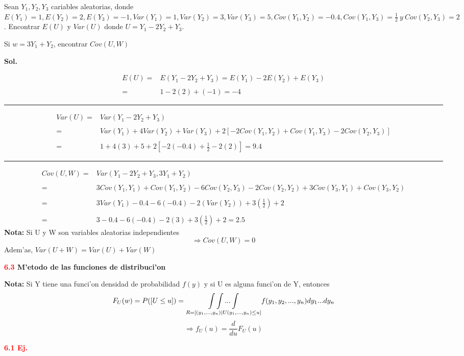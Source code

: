 \documentclass[12pt,letterpaper]{article}
\theoremstyle{definition}
\begin{document}
Sean $Y_1,Y_2,Y_3$ cariables aleatorias, donde $E(Y_1)=1,E(Y_2)=2,E(Y_3)=-1, Var(Y_1)=1,Var(Y_2)=3,Var(Y_3)=5, Cov(Y_1,Y_2)=-0.4,Cov(Y_1,Y_3)=\frac{1}{2}\ y \ Cov(Y_2,Y_3)=2$. Encontrar $E(U)$ y $Var(U)$ donde $U=Y_1-2Y_2+Y_3$.

Si $w=3Y_1+Y_2$, encontrar $Cov(U,W)$

\textbf{Sol.}

\[
\begin{array}{rl}
	E(U)=&E(Y_1-2Y_2+Y_3)=E(Y_1)-2E(Y_2)+E(Y_3)\\ \\
	=& 1-2(2)+(-1)=-4
\end{array}
\]
\par\noindent\rule{\textwidth}{0.5pt}
\[
\begin{array}{rl}
	Var(U)= & Var(Y_1-2Y_2+Y_3)\\ \\
	=&Var(Y_1)+4Var(Y_2)+Var(Y_3)+2[-2Cov(Y_1,Y_2)+Cov(Y_1,Y_3)-2Cov(Y_2,Y_3)]\\ \\
	=& 1+4(3)+5+2[-2(-0.4)+\frac{1}{2}-2(2)]=9.4 
\end{array}
\]
\par\noindent\rule{\textwidth}{0.5pt}
\[
\begin{array}{rl}
	Cov(U,W)=& Var(Y_1-2Y_2+Y_3,3Y_1+Y_2)\\ \\
	=& 3Cov(Y_1,Y_1)+Cov(Y_1,Y_2)-6Cov(Y_2,Y_3)-2 Cov(Y_2,Y_2)+3Cov(Y_3,Y_1)+Cov(Y_3,Y_2)\\ \\
	=& 3Var(Y_1)-0.4-6(-0.4)-2(Var(Y_2))+3(\frac{1}{2})+2\\ \\
	=& 3-0.4-6(-0.4)-2(3)+3(\frac{1}{2})+2=2.5
\end{array}
\]
\textbf{Nota: } Si U y W son variables aleatorias independientes
\[\Rightarrow Cov(U,W)=0\]
Adem'as, $Var(U+W)=Var(U)+Var(W)$

\textbf{\textcolor{red}{6.3} M'etodo de las funciones de distribuci'on}
 
\textbf{Nota: } Si Y tiene una funci'on densidad de probabilidad $f(y)$ y si U es alguna funci'on de Y, entonces 
\[F_U(w)=P([U\leq u])=\underset{\begin{tiny}
R=[(y_1,...,y_n)|U(y_1,...,y_n)\leq u]
\end{tiny}}{\int\int...\int} f(y_1,y_2,...,y_n)dy_1...dy_n\]
\[\Rightarrow f_U(u)=\frac{d}{du}F_U(u)\]

\textbf{\textcolor{red}{6.1 Ej.}}
\end{document}
